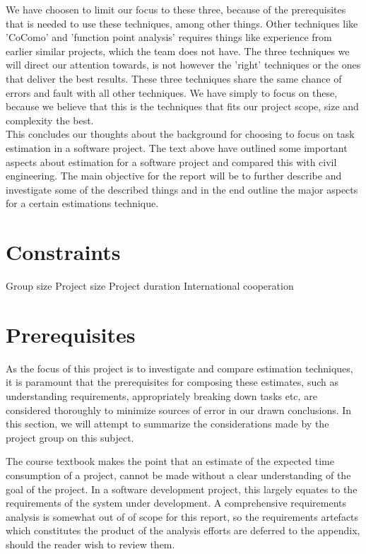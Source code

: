 We have choosen to limit our focus to these three, because of the prerequisites that is needed to use these techniques, among other things. Other techniques like 'CoComo' and 'function point analysis' requires things like experience from earlier similar projects, which the team does not have. The three techniques we will direct our attention towards, is not however the 'right' techniques or the ones that deliver the best results. These three techniques share the same chance of errors and fault with all other techniques. We have simply to focus on these, because we believe that this is the techniques that fits our project scope, size and complexity the best.\\
This concludes our thoughts about the background for choosing to focus on task estimation in a software project. The text above have outlined some important aspects about estimation for a software project and compared this with civil engineering. The main objective for the report will be to further describe and investigate some of the described things and in the end outline the major aspects for a certain estimations technique.

\section{Constraints}
Group size
Project size
Project duration
International cooperation
\section{Prerequisites}
As the focus of this project is to investigate and compare estimation techniques, it is paramount that the prerequisites for composing these estimates, such as understanding requirements, appropriately breaking down tasks etc, are considered thoroughly to minimize sources of error in our drawn conclusions. In this section, we will attempt to summarize the considerations made by the project group on this subject.

The course textbook makes the point that an estimate of the expected time consumption of a project, cannot be made without a clear understanding of the goal of the project. In a software development project, this largely equates to the requirements of the system under development. A comprehensive requirements analysis is somewhat out of of scope for this report, so the requirements artefacts which constitutes the product of the analysis efforts are deferred to the appendix, should the reader wish to review them.

